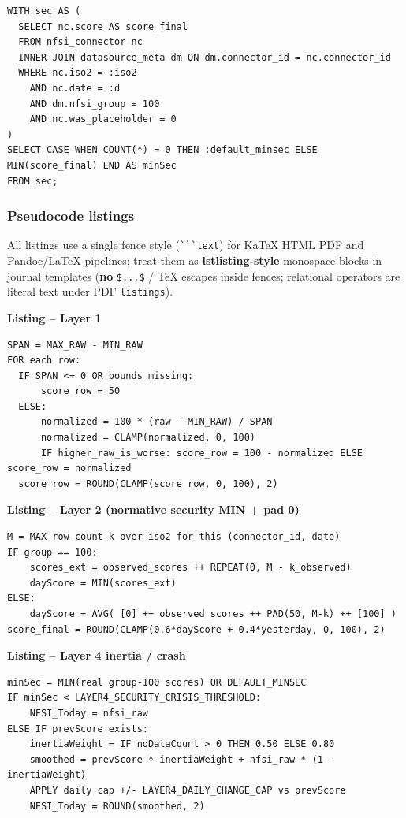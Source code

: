 \documentclass[
  11pt,
  peerreview,journal,onecolumn]{IEEEtran}
\newcommand{\passthrough}[1]{#1}
\begin{document}
\begin{lstlisting}
WITH sec AS (
  SELECT nc.score AS score_final
  FROM nfsi_connector nc
  INNER JOIN datasource_meta dm ON dm.connector_id = nc.connector_id
  WHERE nc.iso2 = :iso2
    AND nc.date = :d
    AND dm.nfsi_group = 100
    AND nc.was_placeholder = 0
)
SELECT CASE WHEN COUNT(*) = 0 THEN :default_minsec ELSE MIN(score_final) END AS minSec
FROM sec;
\end{lstlisting}

\hypertarget{pseudocode-listings}{%
\subsubsection{Pseudocode listings}\label{pseudocode-listings}}

All listings use a single fence style
(\passthrough{\lstinline!```text!}) for KaTeX HTML PDF and Pandoc/LaTeX
pipelines; treat them as \textbf{lstlisting-style} monospace blocks in
journal templates (\textbf{no} \passthrough{\lstinline!$...$!} / TeX
escapes inside fences; relational operators are literal text under PDF
\passthrough{\lstinline!listings!}).

\textbf{Listing -- Layer 1}

\begin{lstlisting}
SPAN = MAX_RAW - MIN_RAW
FOR each row:
  IF SPAN <= 0 OR bounds missing:
      score_row = 50
  ELSE:
      normalized = 100 * (raw - MIN_RAW) / SPAN
      normalized = CLAMP(normalized, 0, 100)
      IF higher_raw_is_worse: score_row = 100 - normalized ELSE score_row = normalized
  score_row = ROUND(CLAMP(score_row, 0, 100), 2)
\end{lstlisting}

\textbf{Listing -- Layer 2 (normative security MIN + pad 0)}

\begin{lstlisting}
M = MAX row-count k over iso2 for this (connector_id, date)
IF group == 100:
    scores_ext = observed_scores ++ REPEAT(0, M - k_observed)
    dayScore = MIN(scores_ext)
ELSE:
    dayScore = AVG( [0] ++ observed_scores ++ PAD(50, M-k) ++ [100] )
score_final = ROUND(CLAMP(0.6*dayScore + 0.4*yesterday, 0, 100), 2)
\end{lstlisting}

\textbf{Listing -- Layer 4 inertia / crash}

\begin{lstlisting}
minSec = MIN(real group-100 scores) OR DEFAULT_MINSEC
IF minSec < LAYER4_SECURITY_CRISIS_THRESHOLD:
    NFSI_Today = nfsi_raw
ELSE IF prevScore exists:
    inertiaWeight = IF noDataCount > 0 THEN 0.50 ELSE 0.80
    smoothed = prevScore * inertiaWeight + nfsi_raw * (1 - inertiaWeight)
    APPLY daily cap +/- LAYER4_DAILY_CHANGE_CAP vs prevScore
    NFSI_Today = ROUND(smoothed, 2)
\end{lstlisting}
\end{document}
